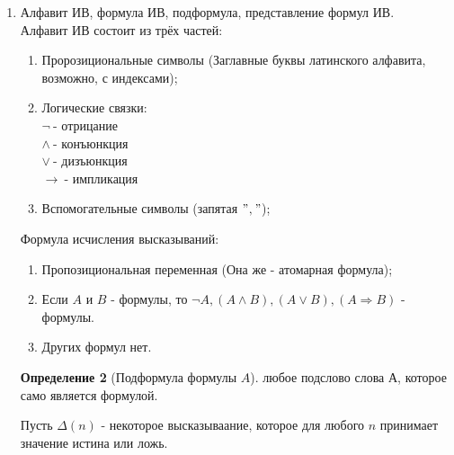 \documentclass[a4paper]{article}
\theoremstyle{definition}
\newtheorem*{definition*}{Определение}
\begin{document}
\begin{enumerate}
       \begin{definition*}[Мощность множества]
        \textit{Мощность} множества $A$ - это единствееный кардинал, равномощный $A$, т.е. $|\mu_A|=|A|$.
       \end{definition*}
 \item Алфавит ИВ, формула ИВ, подформула, представление формул ИВ.
       \\ Алфавит ИВ состоит из трёх частей:
       \begin{enumerate}
        \item Пророзициональные символы (Заглавные буквы латинского алфавита, возможно, с индексами); \\
        \item Логические связки:\\
              $\lnot\ $- отрицание\\
              $\land\ $- конъюнкция\\
              $\lor\ $- дизъюнкция\\
              $\rightarrow\ $- импликация\\
        \item Вспомогательные символы (запятая $"$$,$$"$);
       \end{enumerate}
       Формула исчисления высказываний:
       \begin{enumerate}
        \item Пропозициональная переменная (Она же - атомарная формула);
        \item Если $A$ и $B$ - формулы, то $\lnot A, (A\land B), (A \lor B), (A \Rightarrow B)$ - формулы.
        \item Других формул нет.
       \end{enumerate}
       \begin{definition*}[Подформула формулы $A$]
        любое подслово слова А, которое само является формулой.
       \end{definition*}
       Пусть $\Delta(n)$ - некоторое высказываание, которое для любого $n$ принимает значение истина или ложь.


\end{enumerate}
\end{document}
